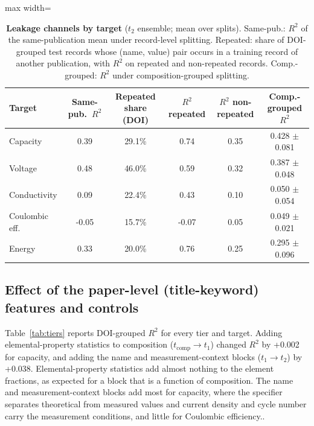 \documentclass[journal=jcisd8,manuscript=article,layout=traditional]{achemso}
\begin{document}
\begin{table}[htbp]
    \centering\small
    \caption{\textbf{Leakage channels by target} ($t_2$ ensemble; mean over splits). Same-pub.: $R^2$ of the same-publication mean under record-level splitting. Repeated: share of DOI-grouped test records whose (name, value) pair occurs in a training record of another publication, with $R^2$ on repeated and non-repeated records. Comp.-grouped: $R^2$ under composition-grouped splitting.}
    \label{tab:channels}
    \begin{adjustbox}{max width=\textwidth}
    \begin{tabular}{@{}lccccc@{}}
        \toprule
        Target & Same-pub.\ $R^2$ & Repeated share (DOI) & $R^2$ repeated & $R^2$ non-repeated & Comp.-grouped $R^2$ \\
        \midrule
        Capacity       & 0.39 & 29.1\% & 0.74 & 0.35 & 0.428 $\pm$ 0.081 \\
        Voltage        & 0.48 & 46.0\% & 0.59 & 0.32 & 0.387 $\pm$ 0.048 \\
        Conductivity   & 0.09 & 22.4\% & 0.43 & 0.10 & 0.050 $\pm$ 0.054 \\
        Coulombic eff. & -0.05 & 15.7\% & -0.07 & 0.05 & 0.049 $\pm$ 0.021 \\
        Energy         & 0.33 & 20.0\% & 0.76 & 0.25 & 0.295 $\pm$ 0.096 \\
        \bottomrule
    \end{tabular}
    \end{adjustbox}
\end{table}

\subsection{Effect of the paper-level (title-keyword) features and controls}
\label{sec:tiers}

Table~\ref{tab:tiers} reports DOI-grouped $R^2$ for every tier and target. Adding elemental-property statistics to composition ($t_{\mathrm{comp}} \rightarrow t_1$) changed $R^2$ by +0.002 for capacity, and adding the name and measurement-context blocks ($t_1 \rightarrow t_2$) by +0.038. Elemental-property statistics add almost nothing to the element fractions, as expected for a block that is a function of composition. The name and measurement-context blocks add most for capacity, where the specifier separates theoretical from measured values and current density and cycle number carry the measurement conditions, and little for Coulombic efficiency..
\end{document}
